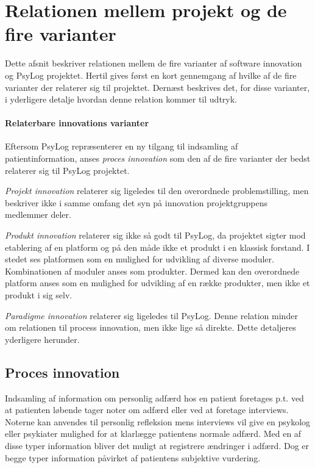 \section{Relationen mellem projekt og de fire varianter}
Dette afsnit beskriver relationen mellem de fire varianter af software innovation\cite[Afsnit 5.1, Side 30-32]{art:essence} og PsyLog projektet.
Hertil gives først en kort gennemgang af hvilke af de fire varianter der relaterer sig til projektet.
Dernæst beskrives det, for disse varianter, i yderligere detalje hvordan denne relation kommer til udtryk.

\paragraph{Relaterbare innovations varianter}
Eftersom PsyLog repræsenterer en ny tilgang til indsamling af patientinformation, anses \textit{proces innovation} som den af de fire varianter der bedst relaterer sig til PsyLog projektet.

\textit{Projekt innovation} relaterer sig ligeledes til den overordnede problemstilling, men beskriver ikke i samme omfang det syn på innovation projektgruppens medlemmer deler.

\textit{Produkt innovation} relaterer sig ikke så godt til PsyLog, da projektet sigter mod etablering af en platform og på den måde ikke et produkt i en klassisk forstand.
I stedet ses platformen som en mulighed for udvikling af diverse moduler.
Kombinationen af moduler anses som produkter.
Dermed kan den overordnede platform anses som en mulighed for udvikling af en række produkter, men ikke et produkt i sig selv.

\textit{Paradigme innovation} relaterer sig ligeledes til PsyLog.
Denne relation minder om relationen til process innovation, men ikke lige så direkte.
Dette detaljeres yderligere herunder.


\subsection{Proces innovation}
Indsamling af information om personlig adfærd hos en patient foretages p.t. ved at patienten løbende tager noter om adfærd eller ved at foretage interviews.
Noterne kan anvendes til personlig refleksion mens interviews vil give en psykolog eller psykiater mulighed for at klarlægge patientens normale adfærd.
Med en af disse typer information bliver det muligt at registrere ændringer i adfærd.
Dog er begge typer information påvirket af patientens subjektive vurdering.

